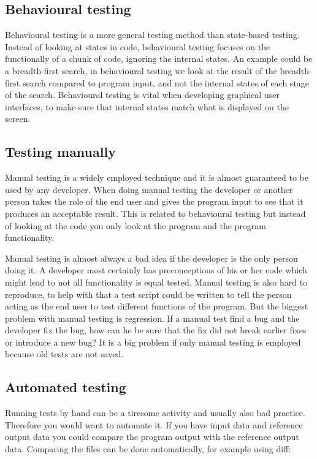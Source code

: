 \documentclass[11pt,a4paper,twoside]{article}
\begin{document}
\subsection{Behavioural testing}

Behavioural testing is a more general testing method than state-based testing.
Instead of looking at states in code, behavioural testing focuses on the
functionally of a chunk of code, ignoring the internal states. An example could
be a breadth-first search, in behavioural testing we look at the result of the
breadth-first search compared to program input, and not the internal states of
each stage of the search. Behavioural testing is vital when developing
graphical user interfaces, to make sure that internal states match what is
displayed on the screen.


\subsection{Testing manually}

Manual testing is a widely employed technique and it is almost guaranteed to be
used by any developer. When doing manual testing the developer or another
person takes the role of the end user and gives the program input to see that
it produces an acceptable result. This is related to behavioural testing but
instead of looking at the code you only look at the program and the program
functionality.

Manual testing is almost always a bad idea if the developer is the only person
doing it. A developer most certainly has preconceptions of his or her code
which might lead to not all functionality is equal tested. Manual testing is
also hard to reproduce, to help with that a test script could be written to
tell the person acting as the end user to test different functions of the
program. But the biggest problem with manual testing is regression. If a manual
test find a bug and the developer fix the bug, how can he be sure that the fix
did not break earlier fixes or introduce a new bug? It is a big problem if
only manual testing is employed because old tests are not saved.

\subsection{Automated testing}

Running tests by hand can be a tiresome activity and usually also bad practice.
Therefore you would want to automate it. If you have input data and reference
output data you could compare the program output with the reference output
data. Comparing the files can be done automatically, for example using diff:
\end{document}
